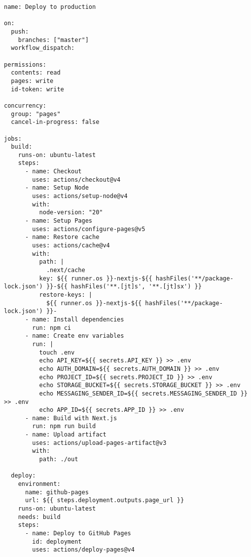 \begin{verbatim}
name: Deploy to production

on:
  push:
    branches: ["master"]
  workflow_dispatch:

permissions:
  contents: read
  pages: write
  id-token: write

concurrency:
  group: "pages"
  cancel-in-progress: false

jobs:
  build:
    runs-on: ubuntu-latest
    steps:
      - name: Checkout
        uses: actions/checkout@v4
      - name: Setup Node
        uses: actions/setup-node@v4
        with:
          node-version: "20"
      - name: Setup Pages
        uses: actions/configure-pages@v5
      - name: Restore cache
        uses: actions/cache@v4
        with:
          path: |
            .next/cache
          key: ${{ runner.os }}-nextjs-${{ hashFiles('**/package-lock.json') }}-${{ hashFiles('**.[jt]s', '**.[jt]sx') }}
          restore-keys: |
            ${{ runner.os }}-nextjs-${{ hashFiles('**/package-lock.json') }}-
      - name: Install dependencies
        run: npm ci
      - name: Create env variables
        run: |
          touch .env
          echo API_KEY=${{ secrets.API_KEY }} >> .env
          echo AUTH_DOMAIN=${{ secrets.AUTH_DOMAIN }} >> .env
          echo PROJECT_ID=${{ secrets.PROJECT_ID }} >> .env
          echo STORAGE_BUCKET=${{ secrets.STORAGE_BUCKET }} >> .env
          echo MESSAGING_SENDER_ID=${{ secrets.MESSAGING_SENDER_ID }} >> .env
          echo APP_ID=${{ secrets.APP_ID }} >> .env
      - name: Build with Next.js
        run: npm run build
      - name: Upload artifact
        uses: actions/upload-pages-artifact@v3
        with:
          path: ./out

  deploy:
    environment:
      name: github-pages
      url: ${{ steps.deployment.outputs.page_url }}
    runs-on: ubuntu-latest
    needs: build
    steps:
      - name: Deploy to GitHub Pages
        id: deployment
        uses: actions/deploy-pages@v4
\end{verbatim}
